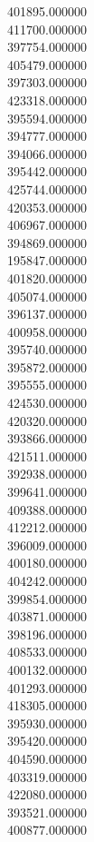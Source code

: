 401895.000000\\
411700.000000\\
397754.000000\\
405479.000000\\
397303.000000\\
423318.000000\\
395594.000000\\
394777.000000\\
394066.000000\\
395442.000000\\
425744.000000\\
420353.000000\\
406967.000000\\
394869.000000\\
195847.000000\\
401820.000000\\
405074.000000\\
396137.000000\\
400958.000000\\
395740.000000\\
395872.000000\\
395555.000000\\
424530.000000\\
420320.000000\\
393866.000000\\
421511.000000\\
392938.000000\\
399641.000000\\
409388.000000\\
412212.000000\\
396009.000000\\
400180.000000\\
404242.000000\\
399854.000000\\
403871.000000\\
398196.000000\\
408533.000000\\
400132.000000\\
401293.000000\\
418305.000000\\
395930.000000\\
395420.000000\\
404590.000000\\
403319.000000\\
422080.000000\\
393521.000000\\
400877.000000\\
